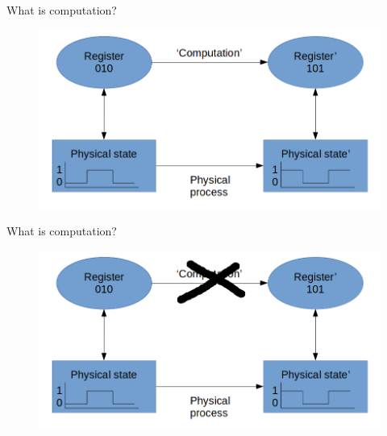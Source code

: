 \documentclass[t]{beamer}
\begin{document}
\begin{frame}{What is computation?}

\begin{figure}
\includegraphics[scale=0.4]{dia1.png}
\end{figure}

\end{frame}


\begin{frame}{What is computation?}

\begin{figure}
\includegraphics[scale=0.4]{dia2.png}
\end{figure}

\end{frame}
\end{document}
